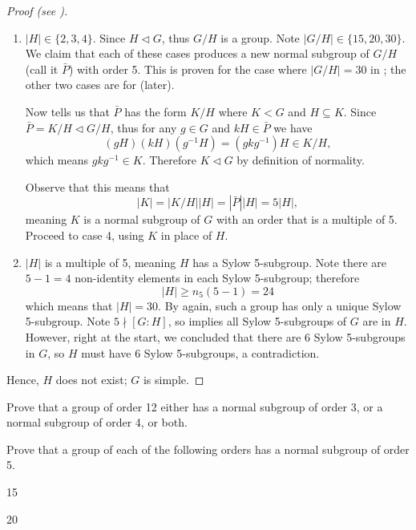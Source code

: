 \begin{proof}[Proof (see {\cite[Proposition 4.21]{dummit_foote_2004}})]
\begin{enumerate}
        \item $|H| \in \{2, 3, 4\}$. Since $H \lhd G$, thus $G/H$ is a group. Note $|G/H| \in \{15, 20, 30\}$. We claim that each of these cases produces a new normal subgroup of $G/H$ (call it $\bar{P}$) with order 5. This is proven for the case where $|G/H| = 30$ in ; the other two cases are for  (later).

        Now  tells us that $\bar{P}$ has the form $K/H$ where $K < G$ and $H \subseteq K$. Since $\bar{P} = K/H \lhd G/H$, thus for any $g \in G$ and $kH \in \bar{P}$ we have
        \[
            (gH)(kH)(g^{-1}H) = (gkg^{-1})H \in K/H,
        \]
        which means $gkg^{-1} \in K$. Therefore $K \lhd G$ by definition of normality.

        Observe that this means that
        \[
            |K| = |K/H||H| = |\bar{P}||H| = 5|H|,    
        \]
        meaning $K$ is a normal subgroup of $G$ with an order that is a multiple of 5. Proceed to case 4, using $K$ in place of $H$.

        \item $|H|$ is a multiple of 5, meaning $H$ has a Sylow 5-subgroup. Note there are $5-1=4$ non-identity elements in each Sylow 5-subgroup; therefore
        \[
            |H| \geq n_5(5-1) = 24
        \]
        which means that $|H| = 30$. By  again, such a group has only a unique Sylow 5-subgroup.  Note $5 \nmid [G:H]$, so  implies all Sylow 5-subgroups of $G$ are in $H$. However, right at the start, we concluded that there are 6 Sylow 5-subgroups in $G$, so $H$ must have 6 Sylow 5-subgroups, a contradiction.
    \end{enumerate}
    Hence, $H$ does not exist; $G$ is simple.
\end{proof}

\begin{exercise}\label{exercise-group-of-order-12-has-normal-subgroup-of-3-or-4}
    Prove that a group of order 12 either has a normal subgroup of order 3, or a normal subgroup of order 4, or both.
\end{exercise}

\begin{exercise}\label{exercise-group-of-order-15-or-20-has-normal-subgroup-of-order-5}
    Prove that a group of each of the following orders has a normal subgroup of order 5.
    \begin{partquestions}{\alph*}
        \item 15
        \item 20
    \end{partquestions}
\end{exercise}

